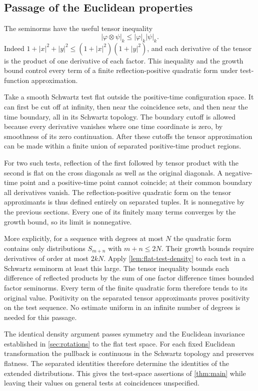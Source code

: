 \documentclass[11pt,letterpaper,reqno]{amsart}
\theoremstyle{definition}
\theoremstyle{remark}
\begin{document}
\subsection{Passage of the Euclidean properties}

The seminorms have the useful tensor inequality
\[
 |\varphi\otimes\psi|_k\le|\varphi|_k|\psi|_k.
\]
Indeed $1+|x|^2+|y|^2\le(1+|x|^2)(1+|y|^2)$, and each derivative
of the tensor is the product of one derivative of each factor.
This inequality and the growth bound control every term of a finite
reflection-positive quadratic form under test-function approximation.

Take a smooth Schwartz test flat outside the positive-time configuration
space. It can first be cut off at infinity, then near the coincidence
sets, and then near the time boundary, all in its Schwartz topology.
The boundary cutoff is allowed because every derivative vanishes where
one time coordinate is zero, by smoothness of its zero continuation.
After these cutoffs the tensor approximation can be made within a
finite union of separated positive-time product regions.

For two such tests, reflection of the first followed by tensor product
with the second is flat on the cross diagonals as well as the original
diagonals. A negative-time point and a positive-time point cannot
coincide; at their common boundary all derivatives vanish. The
reflection-positive quadratic form on the tensor approximants is thus
defined entirely on separated tuples. It is nonnegative by the
previous sections. Every one of its finitely many terms converges by
the growth bound, so its limit is nonnegative.

More explicitly, for a sequence with degrees at most $N$ the
quadratic form contains only distributions $S_{m+n}$ with
$m+n\le2N$. Their growth bounds require derivatives of order at
most $2kN$. Apply \cref{lem:flat-test-density} to each test in a
Schwartz seminorm at least this large. The tensor inequality bounds
each difference of reflected products by the sum of one factor
difference times bounded factor seminorms. Every term of the finite
quadratic form therefore tends to its original value. Positivity on
the separated tensor approximants proves positivity on the test
sequence. No estimate uniform in an infinite number of degrees is
needed for this passage.

The identical density argument passes symmetry and the Euclidean
invariance established in \cref{sec:rotations} to the flat test space.
For each fixed Euclidean transformation the pullback is continuous in
the Schwartz topology and preserves flatness. The separated identities
therefore determine the identities of the extended distributions.
This gives the test-space assertions of \cref{thm:main} while leaving
their values on general tests at coincidences unspecified.
\end{document}
